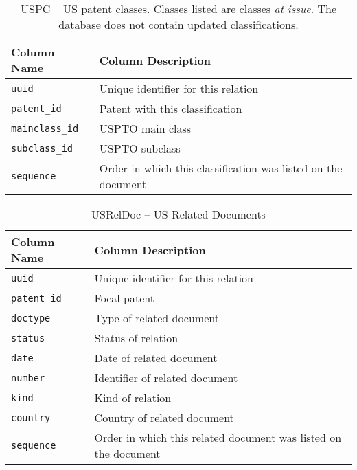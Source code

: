 \begin{table}[ht]
\center
\begin{tabular}{| l | l |}
\hline
Column Name & Column Description \\
\hline
\verb`uuid` & Unique identifier for this relation \\
\verb`patent_id` & Patent with this classification \\
\verb`mainclass_id` & USPTO main class \\
\verb`subclass_id` & USPTO subclass \\
\verb`sequence` & Order in which this classification was listed on the document \\
\hline
\end{tabular}
\caption{USPC -- US patent classes. Classes listed are classes \emph{at issue}. The database does not contain updated classifications.}
\end{table}

\begin{table}[ht]
\center
\begin{tabular}{| l | l |}
\hline
Column Name & Column Description \\
\hline
\verb`uuid` & Unique identifier for this relation \\
\verb`patent_id` & Focal patent \\
\verb`doctype` & Type of related document \\
\verb`status` & Status of relation \\
\verb`date` & Date of related document \\
\verb`number` & Identifier of related document \\
\verb`kind` & Kind of relation \\
\verb`country` & Country of related document \\
\verb`sequence` & Order in which this related document was listed on the document \\
\hline
\end{tabular}
\caption{USRelDoc -- US Related Documents}
\end{table}
